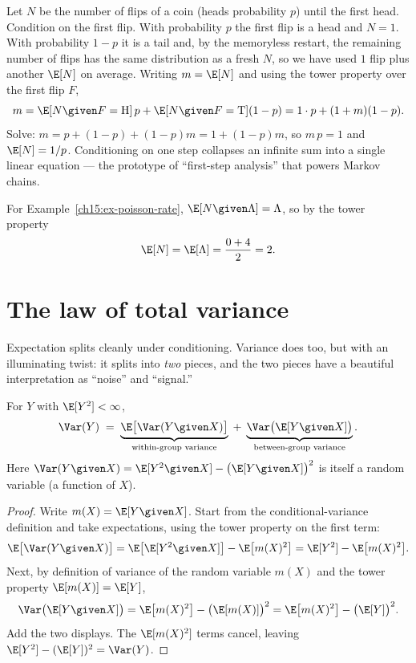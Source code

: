 \begin{example}
\label{ch15:ex-geom}
Let $N$ be the number of flips of a coin (heads probability $p$) until the first head. Condition on the
first flip. With probability $p$ the first flip is a head and $N = 1$. With probability $1-p$ it is a
tail and, by the memoryless restart, the remaining number of flips has the same distribution as a fresh
$N$, so we have used $1$ flip plus another $\E[N]$ on average. Writing $m = \E[N]$ and using the tower
property over the first flip $F$,
\[
  m = \E[N\given F=\text{H}]\,p + \E[N\given F=\text{T}](1-p)
    = 1\cdot p + (1 + m)(1-p).
\]
Solve: $m = p + (1-p) + (1-p)m = 1 + (1-p)m$, so $m\,p = 1$ and $\E[N] = 1/p$. Conditioning on one step
collapses an infinite sum into a single linear equation --- the prototype of ``first-step analysis''
that powers Markov chains.
\end{example}

\begin{example}
For Example~\ref{ch15:ex-poisson-rate}, $\E[N\given \Lambda] = \Lambda$, so by the tower property
\[
  \E[N] = \E[\Lambda] = \frac{0+4}{2} = 2.
\]
\end{example}

\section{The law of total variance}
\label{ch15:total-var}

Expectation splits cleanly under conditioning. Variance does too, but with an illuminating twist: it
splits into \emph{two} pieces, and the two pieces have a beautiful interpretation as ``noise'' and
``signal.''

\begin{theorem}
\label{ch15:thm-eve}
For $Y$ with $\E[Y^2] < \infty$,
\[
  \Var(Y) \;=\; \underbrace{\E\big[\Var(Y\given X)\big]}_{\text{within-group variance}}
  \;+\; \underbrace{\Var\big(\E[Y\given X]\big)}_{\text{between-group variance}}.
\]
Here $\Var(Y\given X) = \E[Y^2 \given X] - \big(\E[Y\given X]\big)^2$ is itself a random variable
(a function of $X$).
\end{theorem}

\begin{proof}
Write $m(X) = \E[Y\given X]$. Start from the conditional-variance definition and take expectations,
using the tower property on the first term:
\[
  \E\big[\Var(Y\given X)\big]
  = \E\big[\E[Y^2\given X]\big] - \E\big[m(X)^2\big]
  = \E[Y^2] - \E\big[m(X)^2\big].
\]
Next, by definition of variance of the random variable $m(X)$ and the tower property
$\E[m(X)] = \E[Y]$,
\[
  \Var\big(\E[Y\given X]\big) = \E\big[m(X)^2\big] - \big(\E[m(X)]\big)^2
  = \E\big[m(X)^2\big] - \big(\E[Y]\big)^2.
\]
Add the two displays. The $\E[m(X)^2]$ terms cancel, leaving
$\E[Y^2] - (\E[Y])^2 = \Var(Y)$.
\end{proof}

